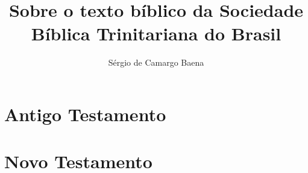 \documentclass[a4paper,oneside]{scrbook}
\author{Sérgio de Camargo Baena}
\title{Sobre o texto bíblico da Sociedade Bíblica Trinitariana do Brasil}
\begin{document}
\maketitle

\setcounter{page}{1}

\tableofcontents

\cleardoublepage

\part{Antigo Testamento}
\setcounter{page}{1}


\part{Novo Testamento}

\end{document}
